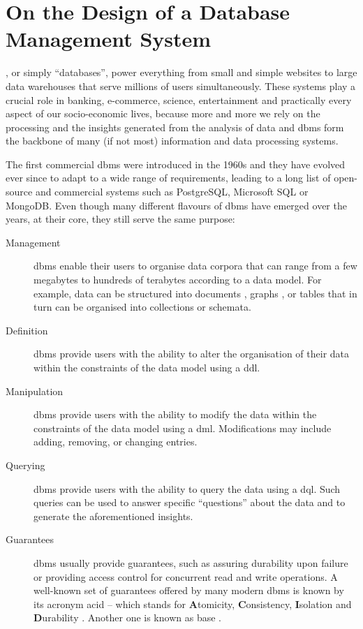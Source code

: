 \chapter{On the Design of a Database Management System}
\label{chapter:theory_databases}


, or simply ``databases'', power everything from small and simple websites to large data warehouses that serve millions of users simultaneously. These systems play a crucial role in banking, e-commerce, science, entertainment and practically every aspect of our socio-economic lives, because more and more we rely on the processing and the insights generated from the analysis of data \cite{Dhar:2013Data} and \acrshort{dbms} form the backbone of many (if not most) information and data processing systems.

The first commercial \acrshort{dbms} were introduced in the 1960s \cite{Garcia:2009Database} and they have evolved ever since to adapt to a wide range of requirements, leading to a long list of open-source and commercial systems such as PostgreSQL, Microsoft SQL or MongoDB. Even though many different flavours of \acrshort{dbms} have emerged over the years, at their core, they still serve the same purpose:

\begin{description}
    \item[Management] \acrshort{dbms} enable their users to organise data corpora that can range from a few megabytes to hundreds of terabytes according to a data model. For example, data can be structured into documents \cite{Hashem:2016Evaluating}, graphs \cite{Angles:2008Survey}, or tables \cite{Codd:1970Relational} that in turn can be organised into collections or schemata.
    \item[Definition] \acrshort{dbms} provide users with the ability to alter the organisation of their data within the constraints of the data model using a \acrfull{ddl}. 
    \item[Manipulation] \acrshort{dbms} provide users with the ability to modify the data within the constraints of the data model using a \acrfull{dml}. Modifications may include adding, removing, or changing entries.
    \item[Querying] \acrshort{dbms} provide users with the ability to query the data using a \acrfull{dql}. Such queries can be used to answer specific ``questions'' about the data and to generate the aforementioned insights.
    \item[Guarantees] \acrshort{dbms} usually provide guarantees, such as assuring durability upon failure or providing access control for concurrent read and write operations. A well-known set of guarantees offered by many modern \acrshort{dbms} is known by its acronym \acrshort{acid} -- which stands for \textbf{A}tomicity, \textbf{C}onsistency, \textbf{I}solation and \textbf{D}urability \cite{Haerder:1983principles}. Another one is known as \acrshort{base} \cite{Pritchett:2008Base}.
\end{description}

